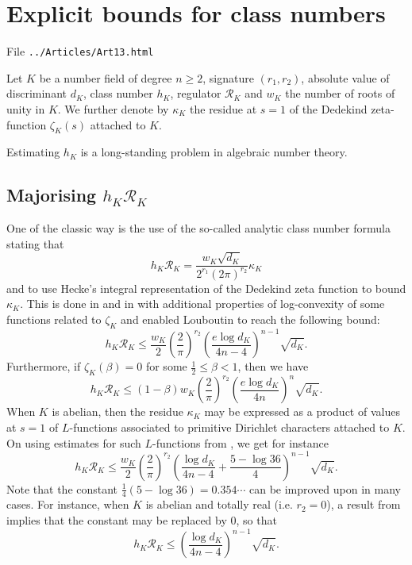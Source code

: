 \chapter{  Explicit bounds for class numbers}

File \texttt{../Articles/Art13.html}









Let $K$ be a number field of degree $n\ge2$, signature $(r_1,r_2)$, absolute
value of discriminant $d_K$, class number $h_K$, regulator $\mathcal{R}_K$ and
$w_K$ the number of roots of unity in $K$. We further denote by $\kappa_K$ the
residue at $s=1$ of the Dedekind zeta-function $\zeta_K(s)$ attached to $K$.

Estimating $h_K$ is a long-standing problem in algebraic number theory.


\section{Majorising $h_K\mathcal{R}_K$
}




One of
the classic way is the use of the so-called analytic class number
formula stating that
$$
h_K\mathcal{R}_K=\frac{w_K \sqrt{d_K}}{2^{r_1}(2\pi)^{r_2}}\kappa_K
$$
and to use Hecke's integral representation of the Dedekind zeta function to
bound $\kappa_K$. This is done in
\cite{Louboutin*00} and in
\cite{Louboutin*01} with additional
properties of log-convexity of some functions related to $\zeta_K$ and enabled
Louboutin to reach the following bound:
$$
h_K\mathcal{R}_K
\le\frac{w_K}{2}\left(\frac{2}{\pi}\right)^{r_2}
\left(\frac{e\log d_K}{4n-4}\right)^{n-1}\sqrt{d_K}.
$$
Furthermore, if $\zeta_K(\beta)=0$ for some $\tfrac12\le \beta< 1$, then we have 
$$
h_K\mathcal{R}_K
\le(1-\beta)w_K\left(\frac{2}{\pi}\right)^{r_2}
\left(\frac{e\log d_K}{4n}\right)^{n}\sqrt{d_K}.
$$
When $K$ is abelian, then the residue $\kappa_K$ may be expressed as a
product of values at $s=1$ of $L$-functions associated to primitive Dirichlet
characters attached to $K$. On using estimates for such $L$-functions from
\cite{Ramare*01}, we get for instance
$$
h_K\mathcal{R}_K
\le
\frac{w_K}{2}\left(\frac{2}{\pi}\right)^{r_2}
\left(\frac{\log d_K}{4n-4}+\frac{5-\log 36}{4}\right)^{n-1}\sqrt{d_K}.
$$
Note that the constant $\frac14(5-\log 36)=0.354\cdots$ can be improved upon
in many cases. For instance, when $K$ is abelian and totally real (i.e. $r_2=0$), a result
from
\cite{Ramare*01} implies that the
constant may be replaced by 0, so that
$$
h_K\mathcal{R}_K
\le
\left(\frac{\log d_K}{4n-4}\right)^{n-1}\sqrt{d_K}.
$$


